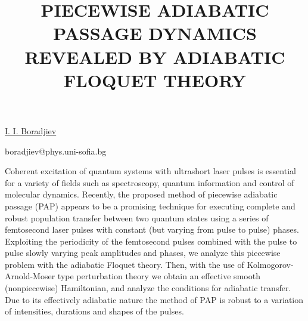 \title{PIECEWISE ADIABATIC PASSAGE DYNAMICS REVEALED BY ADIABATIC FLOQUET THEORY}

\underline{I. I. Boradjiev}

{\normalsize{\vspace{-4mm}
\dijon

\email boradjiev@phys.uni-sofia.bg}}

Coherent excitation of quantum systems with ultrashort laser pulses is essential for a variety of
fields such as spectroscopy, quantum information and control of molecular dynamics. Recently, the
proposed method of piecewise adiabatic passage (PAP) appears to be a promising technique for executing
complete and robust population transfer between two quantum states using a series of femtosecond laser
pulses with constant (but varying from pulse to pulse) phases. Exploiting the periodicity of the
femtosecond pulses combined with the pulse to pulse slowly varying peak amplitudes and phases, we
analyze this piecewise problem with the adiabatic Floquet theory. Then, with the use of Kolmogorov-
Arnold-Moser type perturbation theory we obtain an effective smooth (nonpiecewise) Hamiltonian, and
analyze the conditions for adiabatic transfer. Due to its effectively adiabatic nature the method of
PAP is robust to a variation of intensities, durations and shapes of the pulses.

\vspace{\baselineskip} 